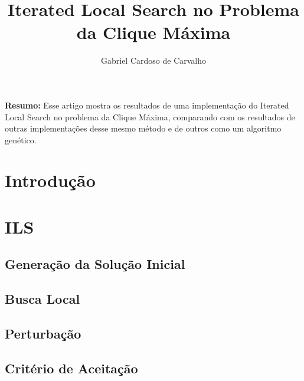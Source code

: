 \documentclass{article}
\title{Iterated Local Search no Problema da Clique Máxima}
\author{Gabriel Cardoso de Carvalho}
\date{}
\begin{document}
\maketitle

\textbf{Resumo:} Esse artigo mostra os resultados de uma implementação do Iterated Local Search no problema da Clique Máxima, comparando com os resultados de outras implementações desse mesmo método e de outros como um algoritmo genético.

\section{Introdução}
\section{ILS}
\subsection{Generação da Solução Inicial}
\subsection{Busca Local}
\subsection{Perturbação}
\subsection{Critério de Aceitação}
\end{document}
